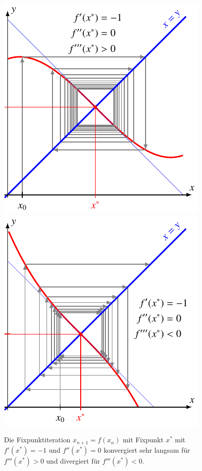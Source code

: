 \begin{figure}
\centering
\includegraphics{chapters/10-arithmetik/figures/mnkp.pdf}
\includegraphics{chapters/10-arithmetik/figures/mnkn.pdf}
\caption{Die Fixpunktiteration $x_{n+1}=f(x_n)$ mit Fixpunkt $x^*$
mit $f'(x^*)=-1$ und $f''(x^*)=0$ konvergiert sehr langsam für $f'''(x^*)>0$
und divergiert für $f'''(x^*)<0$.
\label{buch:figure:fixpunkt:ablm1kub}}
\end{figure}
